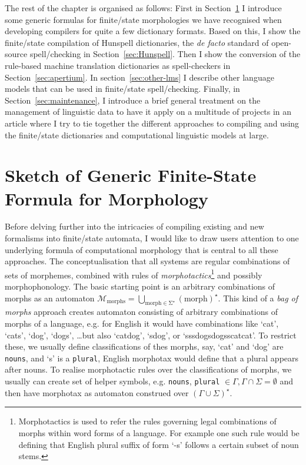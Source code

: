 \documentclass[officiallayout]{unihelcompling}
\begin{document}
The rest of the chapter is organised as follows: First in
Section~\ref{sec:generic} I introduce some generic formulas for finite\-/state
morphologies we have recognised when developing compilers for quite a few
dictionary formats. Based on this, I show the finite\-/state compilation of
Hunspell dictionaries, the \emph{de facto} standard of open-source spell\-/checking in
Section~\ref{sec:Hunspell}.  Then I show the conversion of the rule-based
machine translation dictionaries as spell-checkers in
Section~\ref{sec:apertium}. In section~\ref{sec:other-lms} I describe other
language models that can be used in finite\-/state spell\-/checking. Finally, in
Section~\ref{sec:maintenance}, I introduce a brief general treatment on the
management of linguistic data to have it apply on a multitude of projects in an
article where I try to tie together the different approaches to compiling and
using the finite\-/state dictionaries and computational linguistic models at
large.

\section{Sketch of Generic Finite-State Formula for Morphology}
\label{sec:generic}

Before delving further into the intricacies of compiling existing and new
formalisms into finite\-/state automata, I would like to draw users attention
to one underlying formula of computational morphology that is central to all
these approaches. The conceptualisation that all systems are regular
combinations of sets of morphemes, combined with rules of
\emph{morphotactics}\footnote{Morphotactics is used to refer the rules
    governing legal combinations of morphs within word forms of a language. For
example one such rule would be defining that English plural suffix of form `-s'
follows a certain subset of noun stems.} and possibly morphophonology.  The
basic starting point is an arbitrary combinations of morphs as an automaton
$\mathcal{M}_{\mathrm{morphs}} = \bigcup_{\mathrm{morph \in \Sigma^\star}}
({\mathrm{morph}})^\star$.  This kind of a \emph{bag of morphs} approach
creates automaton consisting of arbitrary combinations of morphs of a language,
e.g. for English it would have combinations like `cat', `cats', `dog', `dogs',
\ldots but also `catdog', `sdog', or `sssdogsdogsscatcat'. To restrict these,
we usually define classifications of thes morphs, say, `cat' and `dog' are
\texttt{nouns}, and `s' is a \texttt{plural}, English morphotax would define
that a plural appears after nouns. To realise morphotactic rules over the
classifications of morphs, we usually can create set of helper symbols, e.g.
{\texttt{nouns}, \texttt{plural}} $\in \Gamma, \Gamma \cap \Sigma = \emptyset$
and then have morphotax as automaton construed over $(\Gamma \cup
\Sigma)^\star$.
\end{document}
